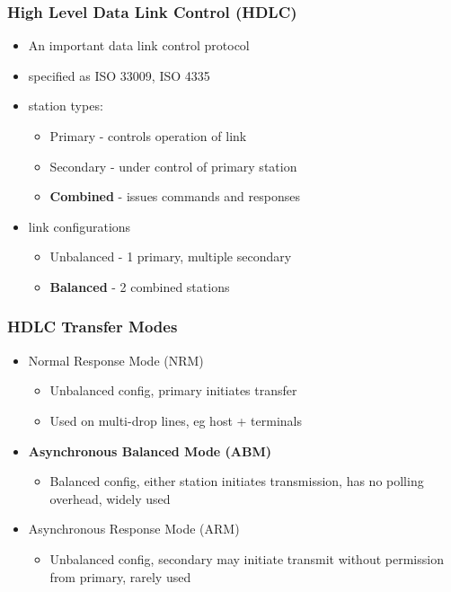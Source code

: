 \documentclass[pdflatex,compress]{beamer}
\begin{document}
\begin{frame}
	\frametitle{High Level Data Link Control (HDLC)}
	\begin{itemize}
		\item An important data link control protocol
		\item specified as ISO 33009, ISO 4335
		\item station types:
		\begin{itemize}
			\item Primary - controls operation of link
			\item Secondary - under control of primary station
			\item \textbf{Combined} - issues commands and responses
		\end{itemize}
		\item link configurations
		\begin{itemize}
			\item Unbalanced - 1 primary, multiple secondary
			\item \textbf{Balanced} - 2 combined stations
		\end{itemize}
	\end{itemize}
\end{frame}

\begin{frame}
	\frametitle{HDLC Transfer Modes}
	\begin{itemize}
		\item Normal Response Mode (NRM)
		\begin{itemize}
			\item Unbalanced config, primary initiates transfer
			\item Used on multi-drop lines, eg host + terminals
		\end{itemize}
		\item \textbf{Asynchronous Balanced Mode (ABM)}
		\begin{itemize}
			\item Balanced config, either station initiates transmission, has no polling overhead, widely used
		\end{itemize}
		\item Asynchronous Response Mode (ARM)
		\begin{itemize}
			\item Unbalanced config, secondary may initiate transmit
			without permission from primary, rarely used
		\end{itemize}
	\end{itemize}
\end{frame}
\end{document}
